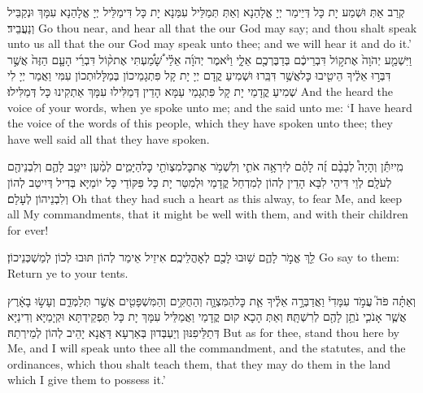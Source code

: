 {קְרַב אַתְּ וּשְׁמַע יָת כָּל דְּיֵימַר יְיָ אֱלָהַנָא וְאַתְּ תְּמַלֵּיל עִמַּנָא יָת כָּל דִּימַלֵּיל יְיָ אֱלָהַנָא עִמָּךְ וּנְקַבֵּיל וְנַעֲבֵיד׃}
{Go thou near, and hear all that the \lord\space our God may say; and thou shalt speak unto us all that the \lord\space our God may speak unto thee; and we will hear it and do it.’}{}
{וַיִּשְׁמַ֤ע יְהֹוָה֙ אֶת\maqqaf ק֣וֹל דִּבְרֵיכֶ֔ם בְּדַבֶּרְכֶ֖ם אֵלָ֑י וַיֹּ֨אמֶר יְהֹוָ֜ה אֵלַ֗י שָׁ֠מַ֠עְתִּי אֶת\maqqaf ק֨וֹל דִּבְרֵ֜י הָעָ֤ם הַזֶּה֙ אֲשֶׁ֣ר דִּבְּר֣וּ אֵלֶ֔יךָ הֵיטִ֖יבוּ כׇּל\maqqaf אֲשֶׁ֥ר דִּבֵּֽרוּ׃}
{וּשְׁמִיעַ קֳדָם יְיָ יָת קָל פִּתְגָמֵיכוֹן בְּמַלָּלוּתְכוֹן עִמִּי וַאֲמַר יְיָ לִי שְׁמִיעַ קֳדָמַי יָת קָל פִּתְגָמֵי עַמָּא הָדֵין דְּמַלִּילוּ עִמָּךְ אַתְקִינוּ כָּל דְּמַלִּילוּ׃}
{And the \lord\space heard the voice of your words, when ye spoke unto me; and the \lord\space said unto me: ‘I have heard the voice of the words of this people, which they have spoken unto thee; they have well said all that they have spoken.}{}

{מִֽי\maqqaf יִתֵּ֡ן וְהָיָה֩ לְבָבָ֨ם זֶ֜ה לָהֶ֗ם לְיִרְאָ֥ה אֹתִ֛י וְלִשְׁמֹ֥ר אֶת\maqqaf כׇּל\maqqaf מִצְוֺתַ֖י כׇּל\maqqaf הַיָּמִ֑ים לְמַ֨עַן יִיטַ֥ב לָהֶ֛ם וְלִבְנֵיהֶ֖ם לְעֹלָֽם׃}
{לְוֵי דִּיהֵי לִבָּא הָדֵין לְהוֹן לְמִדְחַל קֳדָמַי וּלְמִטַּר יָת כָּל פִּקּוֹדַי כָּל יוֹמַיָּא בְּדִיל דְּיִיטַב לְהוֹן וְלִבְנֵיהוֹן לְעָלַם׃}
{Oh that they had such a heart as this alway, to fear Me, and keep all My commandments, that it might be well with them, and with their children for ever!}{}

{לֵ֖ךְ אֱמֹ֣ר לָהֶ֑ם שׁ֥וּבוּ לָכֶ֖ם לְאׇהֳלֵיכֶֽם׃}
{אִיזֵיל אֵימַר לְהוֹן תּוּבוּ לְכוֹן לְמַשְׁכְּנֵיכוֹן׃}
{Go say to them: Return ye to your tents.}{}

{וְאַתָּ֗ה פֹּה֮ עֲמֹ֣ד עִמָּדִי֒ וַאֲדַבְּרָ֣ה אֵלֶ֗יךָ אֵ֧ת כׇּל\maqqaf הַמִּצְוָ֛ה וְהַחֻקִּ֥ים וְהַמִּשְׁפָּטִ֖ים אֲשֶׁ֣ר תְּלַמְּדֵ֑ם וְעָשׂ֣וּ בָאָ֔רֶץ אֲשֶׁ֧ר אָנֹכִ֛י נֹתֵ֥ן לָהֶ֖ם לְרִשְׁתָּֽהּ׃}
{וְאַתְּ הָכָא קוּם קֳדָמַי וַאֲמַלֵּיל עִמָּךְ יָת כָּל תַּפְקֵידְתָּא וּקְיָמַיָּא וְדִינַיָּא דְּתַלֵּיפִנּוּן וְיַעְבְּדוּן בְּאַרְעָא דַּאֲנָא יָהֵיב לְהוֹן לְמֵירְתַהּ׃}
{But as for thee, stand thou here by Me, and I will speak unto thee all the commandment, and the statutes, and the ordinances, which thou shalt teach them, that they may do them in the land which I give them to possess it.’}{}

